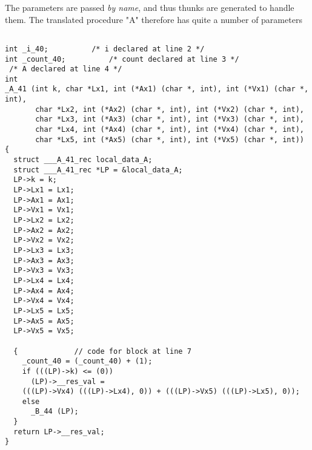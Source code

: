 \documentclass[11pt]{article}
\begin{document}
The parameters are passed {\em by name}, and thus thunks are generated
to handle them. The translated procedure "A" therefore has quite a number
of parameters
{\footnotesize
\begin{verbatim}

int _i_40;			/* i declared at line 2 */
int _count_40;			/* count declared at line 3 */
 /* A declared at line 4 */
int
_A_41 (int k, char *Lx1, int (*Ax1) (char *, int), int (*Vx1) (char *, int),
       char *Lx2, int (*Ax2) (char *, int), int (*Vx2) (char *, int),
       char *Lx3, int (*Ax3) (char *, int), int (*Vx3) (char *, int),
       char *Lx4, int (*Ax4) (char *, int), int (*Vx4) (char *, int),
       char *Lx5, int (*Ax5) (char *, int), int (*Vx5) (char *, int)) {
  struct ___A_41_rec local_data_A;
  struct ___A_41_rec *LP = &local_data_A;
  LP->k = k;
  LP->Lx1 = Lx1;
  LP->Ax1 = Ax1;
  LP->Vx1 = Vx1;
  LP->Lx2 = Lx2;
  LP->Ax2 = Ax2;
  LP->Vx2 = Vx2;
  LP->Lx3 = Lx3;
  LP->Ax3 = Ax3;
  LP->Vx3 = Vx3;
  LP->Lx4 = Lx4;
  LP->Ax4 = Ax4;
  LP->Vx4 = Vx4;
  LP->Lx5 = Lx5;
  LP->Ax5 = Ax5;
  LP->Vx5 = Vx5;

  {				// code for block at line 7
    _count_40 = (_count_40) + (1);
    if (((LP)->k) <= (0))
      (LP)->__res_val =
	(((LP)->Vx4) (((LP)->Lx4), 0)) + (((LP)->Vx5) (((LP)->Lx5), 0));
    else
      _B_44 (LP);
  }
  return LP->__res_val;
}
\end{verbatim}
}
\end{document}
